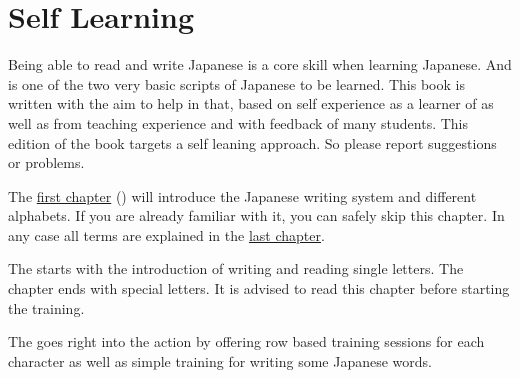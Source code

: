 \section*{Self Learning}

\label{sec:SelfLearning}

Being able to read and write Japanese is a core skill when learning Japanese.
And \textbf{\jtopic} is one of the two very basic scripts of Japanese to be
learned. This book is written with the aim to help in that, based on self
experience as a learner of \jtopic{} as well as from teaching experience
and with feedback of many students. This edition of the book targets a self
leaning approach. So please report suggestions or problems.

The \hyperref[chap:JapaneseWritingSystem]{first chapter}
() will introduce the Japanese writing
system and different alphabets. If you are already familiar with it, you can
safely skip this chapter. In any case all terms are explained in the
\hyperref[chap:Terminology]{last chapter}.

The %
%
%
starts with the introduction of writing and reading single \textbf{\jtopic}
letters. The chapter ends with special \textbf{\jtopic} letters. It is advised
to read this chapter before starting the training.

The %
%
%
goes right into the action by offering row based training sessions for each
character as well as simple training for writing some Japanese \textbf{\jtopic}
words.

